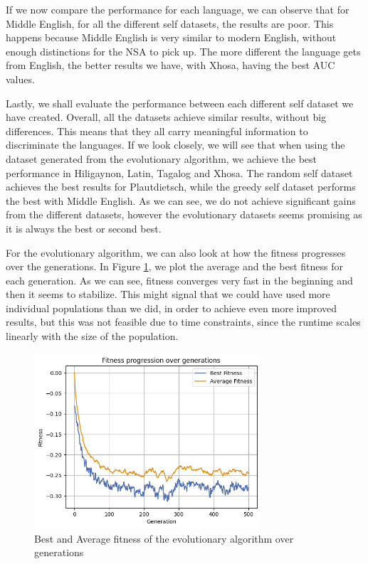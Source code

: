 \documentclass{article}
\begin{document}
If we now compare the performance for each language, we can observe that for Middle English, for all the different self 
datasets, the results are poor. This happens because Middle English is very similar to modern English, without enough 
distinctions for the NSA to pick up. The more different the language gets from English, the better results we have, 
with Xhosa, having the best AUC values.

Lastly, we shall evaluate the performance between each different self dataset we have created. Overall, all the datasets 
achieve similar results, without big differences. This means that they all carry meaningful information to 
discriminate the languages. If we look closely, we will see that when using the dataset generated from the evolutionary 
algorithm, we achieve the best performance in Hiligaynon, Latin, Tagalog and Xhosa. The random self dataset achieves the 
best results for Plautdietsch, while the greedy self dataset performs the best with Middle English. As we can see, we 
do not achieve significant gains from the different datasets, however the evolutionary datasets seems promising as it is 
always the best or second best.

For the evolutionary algorithm, we can also look at how the fitness progresses over the generations. In Figure 
\ref{fig:ea_fit_over_gens}, we plot the average and the best fitness for each generation. As we can see, fitness 
converges very fast in the beginning and then it seems to stabilize. This might signal that we could have used more 
individual populations than we did, in order to achieve even more improved results, but this was not feasible due to 
time constraints, since the runtime scales linearly with the size of the population. 

\begin{figure}[ht]
    \includegraphics[width=0.75\textwidth]{images/fitness_over_gens.jpeg}
    \caption{Best and Average fitness of the evolutionary algorithm over generations}
    \label{fig:ea_fit_over_gens}
\end{figure}
\end{document}

